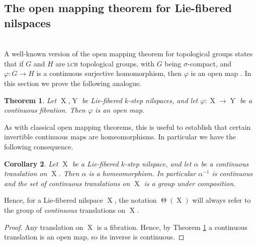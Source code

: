 \documentclass[a4paper,12pt,reqno]{amsart}
\newtheorem{theorem}{Theorem}[section]
\newtheorem{corollary}[theorem]{Corollary}
\theoremstyle{definition}
\def\to{\rightarrow}
\DeclareMathOperator{\tran}{\Theta}
\DeclareMathOperator{\ns}{X}
\DeclareMathOperator{\nss}{Y}
\begin{document}
\subsection{The open mapping theorem for Lie-fibered nilspaces}\hfill\\
A well-known version of the open mapping theorem for topological groups states that if $G$ and $H$ are \textsc{lch} topological groups, with $G$ being $\sigma$-compact, and $\varphi:G\to H$ is a continuous surjective homomorphism, then $\varphi$ is an open map \cite[p.\ 669]{H&M-Cpct}. In this section we prove the following analogue.
\begin{theorem}\label{thm:open-mapping-thm}
Let $\ns$,$\nss$ be Lie-fibered $k$-step nilspaces, and let $\varphi:\ns\to\nss$ be a continuous fibration. Then $\varphi$ is an open map.
\end{theorem}
\noindent As with classical open mapping theorems, this is useful to establish that certain invertible continuous maps are homeomorphisms. In particular we have the following consequence.
\begin{corollary}\label{cor:inv-cont-lcfr}
Let $\ns$ be a Lie-fibered $k$-step nilspace, and let $\alpha$ be a continuous translation on $\ns$. Then $\alpha$ is a homeomorphism. In particular $\alpha^{-1}$ is continuous and the set of continuous translations on $\ns$ is a group under composition.
\end{corollary}
\noindent Hence, for a Lie-fibered nilspace $\ns$, the notation $\tran(\ns)$ will always refer to the group of \emph{continuous} translations on $\ns$.
\begin{proof}
Any translation on $\ns$ is a fibration. Hence, by Theorem \ref{thm:open-mapping-thm} a continuous translation is an open map, so its inverse is continuous.
\end{proof}
\end{document}
